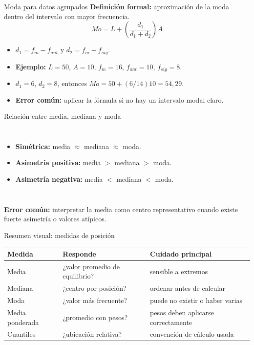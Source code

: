 \documentclass[aspectratio=169,11pt]{beamer}
\newcommand{\errorcomun}[1]{\textbf{Error común:} #1}
\begin{document}
\begin{frame}{Moda para datos agrupados}
\textbf{Definición formal:} aproximación de la moda dentro del intervalo con mayor frecuencia.
\[
Mo=L+\left(\frac{d_1}{d_1+d_2}\right)A
\]
\begin{itemize}
  \item $d_1=f_m-f_{ant}$ y $d_2=f_m-f_{sig}$.
  \item \textbf{Ejemplo:} $L=50$, $A=10$, $f_m=16$, $f_{ant}=10$, $f_{sig}=8$.
  \item $d_1=6$, $d_2=8$, entonces $Mo=50+(6/14)10=54{,}29$.
  \item \errorcomun{aplicar la fórmula si no hay un intervalo modal claro.}
\end{itemize}
\end{frame}

\begin{frame}{Relación entre media, mediana y moda}
\begin{columns}[T]
\begin{itemize}
  \item \textbf{Simétrica:} media $\approx$ mediana $\approx$ moda.
  \item \textbf{Asimetría positiva:} media $>$ mediana $>$ moda.
  \item \textbf{Asimetría negativa:} media $<$ mediana $<$ moda.
\end{itemize}
\centering
{}
\end{columns}
\vspace{0.4em}
\errorcomun{interpretar la media como centro representativo cuando existe fuerte asimetría o valores atípicos.}
\end{frame}

\begin{frame}{Resumen visual: medidas de posición}
\small
\begin{tabular}{p{}p{}p{}}
\toprule
Medida & Responde & Cuidado principal \\
\midrule
Media & ¿valor promedio de equilibrio? & sensible a extremos \\
Mediana & ¿centro por posición? & ordenar antes de calcular \\
Moda & ¿valor más frecuente? & puede no existir o haber varias \\
Media ponderada & ¿promedio con pesos? & pesos deben aplicarse correctamente \\
Cuantiles & ¿ubicación relativa? & convención de cálculo usada \\
\bottomrule
\end{tabular}
\end{frame}
\end{document}
